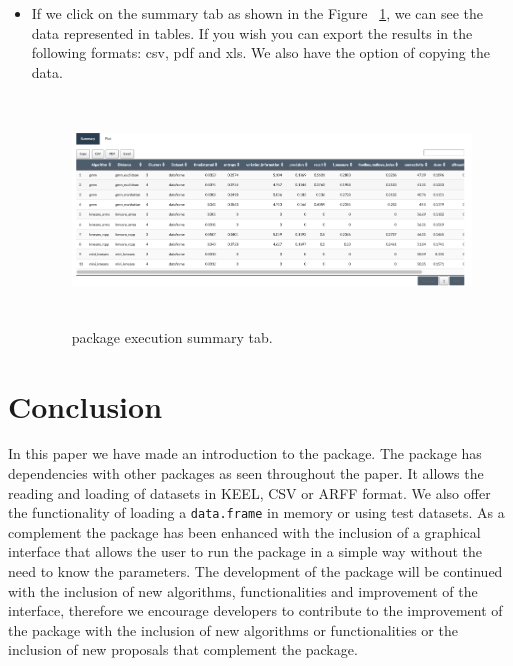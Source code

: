 \begin{enumerate}
\begin{itemize}
    \item If we click on the summary tab as shown in the Figure ~\ref{fig:tab_summary}, we can see the data represented in tables. If you wish you can export the results in the following formats: csv, pdf and xls. We also have the option of copying the data.

  \begin{figure}[htbp]
    \centering
     \includegraphics[width=14cm, height=6cm]{img/tab_summary}
      \caption{ package execution summary tab.}
      \label{fig:tab_summary}
  \end{figure}

  \end{itemize}

\end{enumerate}
\newpage
\section{Conclusion}

In this paper we have made an introduction to the  package. The package has dependencies with other packages as seen throughout the paper. It allows the reading and loading of datasets in KEEL, CSV or ARFF format. We also offer the functionality of loading a \texttt{data.frame} in memory or using test datasets. As a complement the package has been enhanced with the inclusion of a graphical interface that allows the user to run the package in a simple way without the need to know the parameters. The development of the package will be continued with the inclusion of new algorithms, functionalities and improvement of the interface, therefore we encourage developers to contribute to the improvement of the package with the inclusion of new algorithms or functionalities or the inclusion of new proposals that complement the package.



